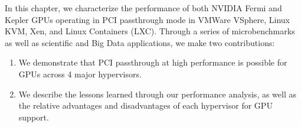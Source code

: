 
In this chapter, we characterize the performance of both NVIDIA Fermi and Kepler GPUs
operating in PCI passthrough mode in VMWare VSphere, Linux KVM, Xen, and Linux
Containers (LXC).  Through a series of microbenchmarks as well as scientific and
Big Data applications, we make two contributions: 

\begin{enumerate}
\item We demonstrate that PCI passthrough at high performance is possible for
GPUs across 4 major hypervisors.
\item We describe the lessons learned through our performance analysis, as well as the relative advantages
and disadvantages of each hypervisor for GPU support.
\end{enumerate}








